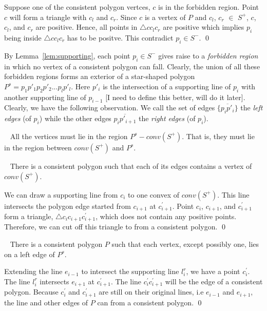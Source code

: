 \documentclass[fullpage,my,12pt]{article}
\begin{document}
\pf
Suppose one of the consistent polygon vertces, $c$ is in the
forbidden region. Point $c$ will form a triangle with $c_l$ and $c_r$.
Since $c$ is a vertex of $P$ and $c_l$, $c_r$ $\in$ $S^+$, $c$,
$c_l$, and $c_r$ are positive. Hence, all points in $\triangle c c_l c_r$
are positive which implies $p_i$ being inside $\triangle c c_l c_r$
has to be positve. This contradict $p_i \in S^-$.
\qed

By Lemma~\ref{lem:supporting}, each point $p_i \in S^-$ gives
raise to a {\em forbidden region} in which no vertex of a
consistent polygon can fall. Clearly, the union of all these
forbidden regions forms an exterior of a star-shaped polygon
$P^s = p_1 p'_1 p_2 p'_2 ... p_l p'_l$. Here $p'_i$ is the
intersection of a supporting line of $p_i$ with another
supporting line of $p_{i-1}$ [I need to define this better, will
do it later]. Clearly, we have the following observation. We call
the set of edges $\{\overline{p_ip'_i}\}$ the {\em left edges}
(of $p_i$) while the other edges $\overline{p_ip'_{i+1}}$ the
{\em right edges} (of $p_i$).


\begin{observation}~\label{lem:between}
All the vertices must lie in the region $P^s - conv(S^+)$. That
is, they must lie in the region between $conv(S^+)$ and $P^s$.
\end{observation}

\begin{lemma}~\label{lem:onePoint}
There is a consistent polygon such that each of its edges
contains a vertex of $conv(S^+)$.

\end{lemma}
\pf
We can draw a supporting line from $c_i$ to one convex of $conv(S^+)$.
This line intersects the polygon edge started from $c_{i+1}$ at $c_{i+1}^'$.
Point $c_i$, $c_{i+1}$, and $c_{i+1}^'$ form a triangle, $\triangle c_i c_{i+1} c_{i+1}^'$,
which does not contain any positive points. Therefore, we can cut off this triangle
to from a consistent polygon.
\qed

\begin{lemma}~\label{lem:leftEdge}
There is a consistent polygon $P$ such that each vertex, except
possibly one, lies on a left edge of $P^s$.
\end{lemma}
\pf
Extending the line $e_{i-1}$ to intersect the supporting line $l_i^r$, we have
a point $c_i^'$. The line $l_i^r$ intersects $e_{i+1}$ at $c_{i+1}^'$. The
line $c_i^' c_{i+1}^'$ will be the edge of a consistent polygon. Because
$c_i^'$ and $c_{i+1}^'$ are still on their original lines, i.e $e_{i-1}$ and $e_{i+1}$,
the line and other edges of $P$ can from a consistent polygon.
\qed
\end{document}
